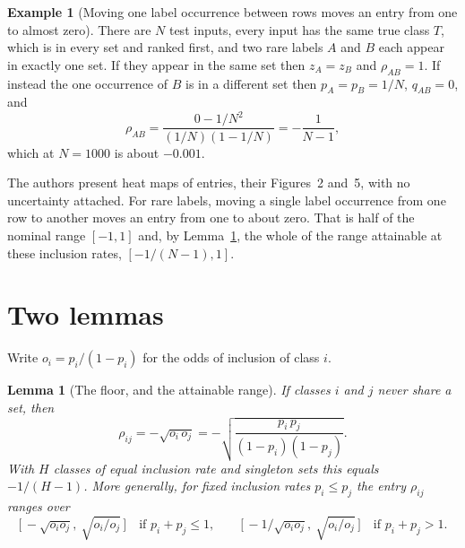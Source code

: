 \documentclass[11pt]{article}
\newtheorem{lemma}{Lemma}
\theoremstyle{definition}
\newtheorem{example}{Example}
\theoremstyle{definition}
\theoremstyle{remark}
\begin{document}
\begin{example}[Moving one label occurrence between rows moves an entry from one to almost zero]\label{ex:move}
There are $N$ test inputs, every input has the same true class $T$, which is in every set and ranked
first, and two rare labels $A$ and $B$ each appear in exactly one set. If they appear in the same set then $z_A = z_B$
and $\rho_{AB} = 1$. If instead the one occurrence of $B$ is
in a different set then $p_A = p_B = 1/N$, $q_{AB} = 0$, and
\[
\rho_{AB} = \frac{0 - 1/N^2}{(1/N)(1-1/N)} = -\frac{1}{N-1},
\]
which at $N = 1000$ is about $-0.001$.

The authors present heat maps of entries, their Figures~2 and~5, with no uncertainty attached. For rare labels, moving a
single label occurrence from one row to another moves an entry from one to about zero. That is half of the nominal range $[-1, 1]$ and, by
Lemma~\ref{lem:floor}, the whole of the range attainable at these inclusion rates,
$[-1/(N-1), 1]$.
\end{example}

\section{Two lemmas}\label{sec:lemmas}

Write $o_i = p_i/(1-p_i)$ for the odds of inclusion of class $i$.

\begin{lemma}[The floor, and the attainable range]\label{lem:floor}
If classes $i$ and $j$ never share a set, then
\begin{equation}\label{eq:floor}
\rho_{ij} = -\sqrt{o_i\, o_j} = -\sqrt{\frac{p_i\, p_j}{(1-p_i)(1-p_j)}} .
\end{equation}
With $H$ classes of equal inclusion rate and singleton sets this equals $-1/(H-1)$. More generally,
for fixed inclusion rates $p_i \le p_j$ the entry $\rho_{ij}$ ranges over
\[
\Big[\, -\sqrt{o_i o_j},\ \sqrt{o_i / o_j}\, \Big] \quad \text{if } p_i + p_j \le 1, \qquad
\Big[\, -1/\sqrt{o_i o_j},\ \sqrt{o_i / o_j}\, \Big] \quad \text{if } p_i + p_j > 1 .
\]
\end{lemma}
\end{document}
